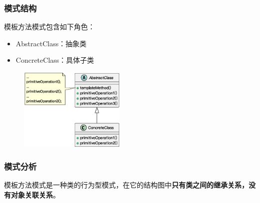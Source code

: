 \subsubsection{模式结构}
模板方法模式包含如下角色：
\vspace{-0.8em}
\begin{multicols}{2}
    \begin{itemize}
        \item AbstractClass：抽象类
        \item ConcreteClass：具体子类
    \end{itemize}
\end{multicols}
\vspace{-1em}

\begin{figure}[H]
    \vspace{-0.5em}
	\centering
	\includegraphics[width=0.45\textwidth]{images/模板方法模式结构.eps}
    \vspace{-1em}
\end{figure}

\subsubsection{模式分析}
模板方法模式是一种类的行为型模式，在它的结构图中\textbf{只有类之间的继承关系，没有对象关联关系}。

